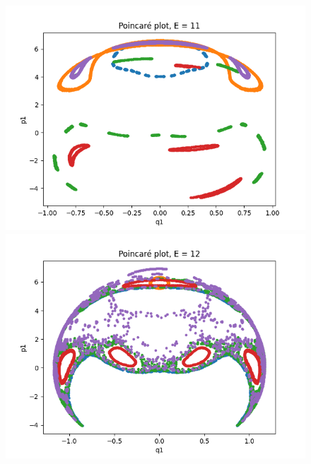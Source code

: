 \documentclass[a4paper,12pt]{article}
\begin{document}
\begin{figure}[!ht]
  \centering
  \begin{minipage}{0.4\textwidth}
    \includegraphics[width=\textwidth]{img/poincare-11.png}
  \end{minipage}
  \begin{minipage}{0.4\textwidth}
    \includegraphics[width=\textwidth]{img/poincare-12.png}
  \end{minipage}
\end{figure}
\end{document}
